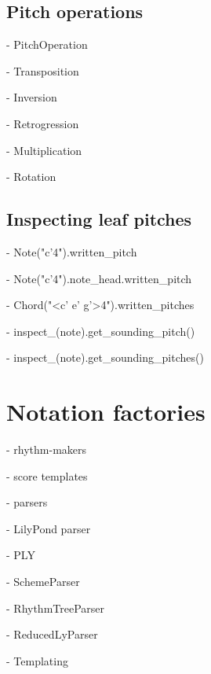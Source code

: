 \subsection{Pitch operations}

-   PitchOperation

-   Transposition

-   Inversion

-   Retrogression

-   Multiplication

-   Rotation

\subsection{Inspecting leaf pitches}

-   Note("c'4").written\_pitch

-   Note("c'4").note\_head.written\_pitch

-   Chord("<c' e' g'>4").written\_pitches

-   inspect\_(note).get\_sounding\_pitch()

-   inspect\_(note).get\_sounding\_pitches()

\section{Notation factories}

-   rhythm-makers

-   score templates

-   parsers

    -   LilyPond parser

    -   PLY

    -   SchemeParser

    -   RhythmTreeParser

    -   ReducedLyParser

- Templating